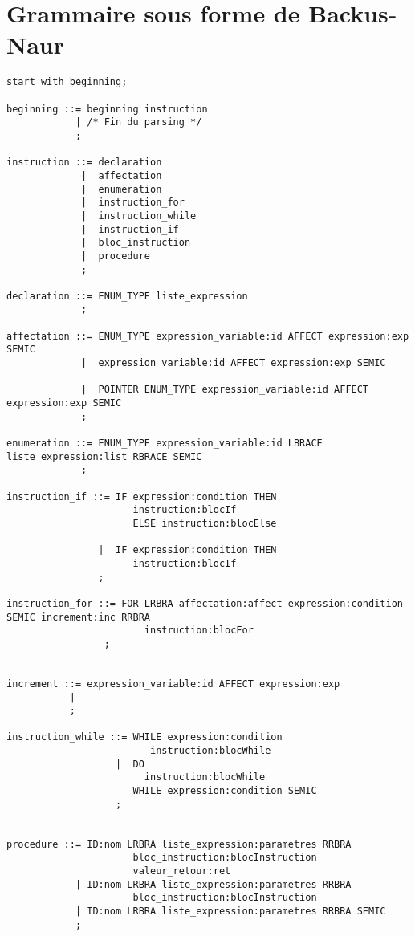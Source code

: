 \documentclass[16pts]{report}
\begin{document}
\section{Grammaire sous forme de Backus-Naur}

\begin{lstlisting}
start with beginning;

beginning ::= beginning instruction
            | /* Fin du parsing */
            ;

instruction ::= declaration
             |  affectation
             |  enumeration
             |  instruction_for
             |  instruction_while
             |  instruction_if
             |  bloc_instruction
             |  procedure
             ;

declaration ::= ENUM_TYPE liste_expression
             ;

affectation ::= ENUM_TYPE expression_variable:id AFFECT expression:exp SEMIC
             |  expression_variable:id AFFECT expression:exp SEMIC

             |  POINTER ENUM_TYPE expression_variable:id AFFECT expression:exp SEMIC
             ;

enumeration ::= ENUM_TYPE expression_variable:id LBRACE liste_expression:list RBRACE SEMIC
             ;

instruction_if ::= IF expression:condition THEN
                      instruction:blocIf
                      ELSE instruction:blocElse

                |  IF expression:condition THEN
                      instruction:blocIf
                ;

instruction_for ::= FOR LRBRA affectation:affect expression:condition SEMIC increment:inc RRBRA
                        instruction:blocFor
                 ;


increment ::= expression_variable:id AFFECT expression:exp
           |
           ;

instruction_while ::= WHILE expression:condition
                         instruction:blocWhile
                   |  DO
                        instruction:blocWhile
                      WHILE expression:condition SEMIC
                   ;


procedure ::= ID:nom LRBRA liste_expression:parametres RRBRA
                      bloc_instruction:blocInstruction
                      valeur_retour:ret
            | ID:nom LRBRA liste_expression:parametres RRBRA
                      bloc_instruction:blocInstruction
            | ID:nom LRBRA liste_expression:parametres RRBRA SEMIC
            ;


\end{lstlisting}
\end{document}
